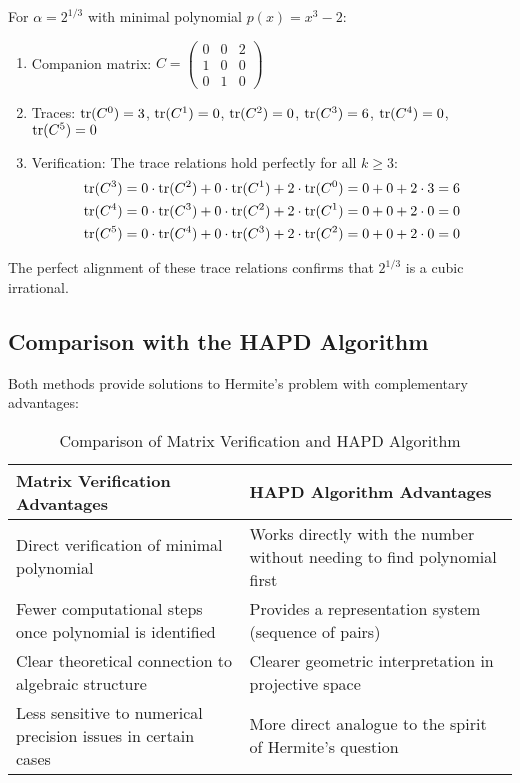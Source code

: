 \begin{example}
For $\alpha = 2^{1/3}$ with minimal polynomial $p(x) = x^3 - 2$:
\begin{enumerate}
    \item Companion matrix: $C = \begin{pmatrix} 0 & 0 & 2 \\ 1 & 0 & 0 \\ 0 & 1 & 0 \end{pmatrix}$
    \item Traces: $\operatorname{tr}(C^0) = 3$, $\operatorname{tr}(C^1) = 0$, $\operatorname{tr}(C^2) = 0$, $\operatorname{tr}(C^3) = 6$, $\operatorname{tr}(C^4) = 0$, $\operatorname{tr}(C^5) = 0$
    \item Verification: The trace relations hold perfectly for all $k \geq 3$:
    \begin{align*}
        \operatorname{tr}(C^3) &= 0 \cdot \operatorname{tr}(C^2) + 0 \cdot \operatorname{tr}(C^1) + 2 \cdot \operatorname{tr}(C^0) = 0 + 0 + 2 \cdot 3 = 6 \\
        \operatorname{tr}(C^4) &= 0 \cdot \operatorname{tr}(C^3) + 0 \cdot \operatorname{tr}(C^2) + 2 \cdot \operatorname{tr}(C^1) = 0 + 0 + 2 \cdot 0 = 0 \\
        \operatorname{tr}(C^5) &= 0 \cdot \operatorname{tr}(C^4) + 0 \cdot \operatorname{tr}(C^3) + 2 \cdot \operatorname{tr}(C^2) = 0 + 0 + 2 \cdot 0 = 0
    \end{align*}
\end{enumerate}
The perfect alignment of these trace relations confirms that $2^{1/3}$ is a cubic irrational.
\end{example}

\subsection{Comparison with the HAPD Algorithm}

Both methods provide solutions to Hermite's problem with complementary advantages:

\begin{table}[h]
\centering
\caption{Comparison of Matrix Verification and HAPD Algorithm}
\label{tab:comparison}
\begin{tabular}{|p{}|p{}|}
\hline
\textbf{Matrix Verification Advantages} & \textbf{HAPD Algorithm Advantages} \\
\hline
Direct verification of minimal polynomial & Works directly with the number without needing to find polynomial first \\
\hline
Fewer computational steps once polynomial is identified & Provides a representation system (sequence of pairs) \\
\hline
Clear theoretical connection to algebraic structure & Clearer geometric interpretation in projective space \\
\hline
Less sensitive to numerical precision issues in certain cases & More direct analogue to the spirit of Hermite's question \\
\hline
\end{tabular}
\end{table}

